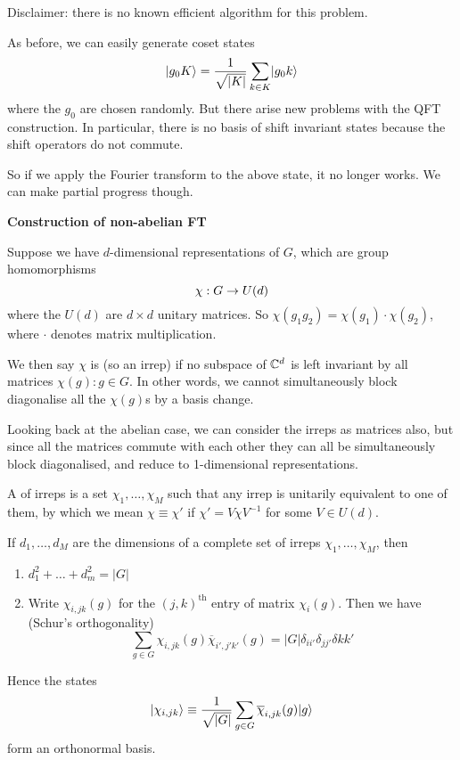 \documentclass[]{article}
\renewcommand{\it}[1]{\textit{#1}}
\renewcommand{\bar}{\overline}
\begin{document}
\begin{remark*}[Remarks on HSP for {\it non}-abelian groups $G$]
Disclaimer: there is no known efficient algorithm for this problem.

As before, we can easily generate coset states
\[
\lvert g_0 K\rangle = \frac{1}{\sqrt{|K|}} \sum_{k \in K}\lvert g_0 k\rangle
\]
where the $g_0$ are chosen randomly. But there arise new problems with the QFT construction. In particular, there is no basis of shift invariant states because the shift operators do not commute.

So if we apply the Fourier transform to the above state, it no longer works. We can make partial progress though.

\textbf{Construction of non-abelian FT}

Suppose we have $d$-dimensional representations of $G$, which are group homomorphisms
\[
\chi : G \rightarrow U(d)
\]
where the $U(d)$ are $d\times d$ unitary matrices. So $\chi(g_1 g_2) = \chi(g_1)\cdot \chi(g_2)$, where $\cdot$ denotes matrix multiplication.

We then say $\chi$ is  (so an irrep) if no subspace of $\mathbb{C}^d$ is left invariant by all matrices $\chi(g): g\in G$. In other words, we cannot simultaneously block diagonalise all the $\chi(g)$s by a basis change.

Looking back at the abelian case, we can consider the irreps as matrices also, but since all the matrices commute with each other they can all be simultaneously block diagonalised, and reduce to 1-dimensional representations.

A  of irreps is a set $\chi_1,\dots,\chi_M$ such that any irrep is unitarily equivalent to one of them, by which we mean $\chi \equiv \chi'$ if $\chi' = V\chi V^{-1}$ for some $V \in U(d)$.

\begin{theorem*}
If $d_1,\dots,d_M$ are the dimensions of a complete set of irreps $\chi_1,\dots,\chi_M$, then
\begin{enumerate}[label = (\roman*)]
	\item $d_1^2 +\dots + d_m^2 = |G|$
	\item Write $\chi_{i,jk}(g)$ for the $(j,k)^{\textrm{th}}$ entry of matrix $\chi_i(g)$. Then we have (Schur's orthogonality)
	\[
	\sum_{g\in G} \chi_{i,jk}(g)\bar{\chi}_{i',j'k'}(g) = |G| \delta_{ii'}\delta_{jj'}\delta{kk'}
	\]
\end{enumerate}
\end{theorem*}
Hence the states
\[
\ket{\chi_{i,jk}} \equiv \frac{1}{\sqrt{|G|}} \sum_{g\in G}\bar{\chi}_{i,jk}(g)\ket{g}
\]
form an orthonormal basis.


\end{remark*}
\end{document}
